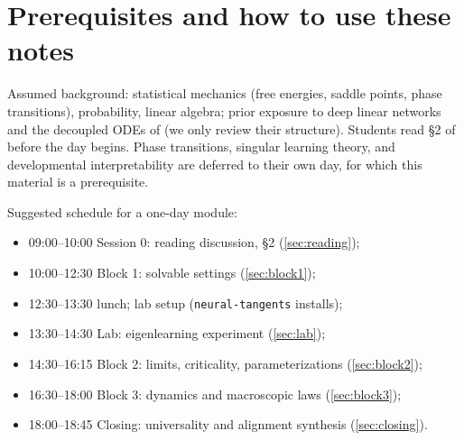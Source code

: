 \documentclass[11pt]{article}
\begin{document}
\section{Prerequisites and how to use these notes}
\label{sec:prereqs}

Assumed background: statistical mechanics (free energies, saddle points,
phase transitions), probability, linear algebra; prior exposure to deep
linear networks and the decoupled ODEs of \cite{saxe2014exact} (we only
review their structure). Students read \S2 of \cite{simon2026scientific}
before the day begins. Phase transitions, singular learning theory, and
developmental interpretability are deferred to their own day, for which this
material is a prerequisite.

Suggested schedule for a one-day module:
\begin{itemize}
  \item 09:00--10:00 \quad Session 0: reading discussion, \cite{simon2026scientific} \S2 (\cref{sec:reading});
  \item 10:00--12:30 \quad Block 1: solvable settings (\cref{sec:block1});
  \item 12:30--13:30 \quad lunch; lab setup (\texttt{neural-tangents} installs);
  \item 13:30--14:30 \quad Lab: eigenlearning experiment (\cref{sec:lab});
  \item 14:30--16:15 \quad Block 2: limits, criticality, parameterizations (\cref{sec:block2});
  \item 16:30--18:00 \quad Block 3: dynamics and macroscopic laws (\cref{sec:block3});
  \item 18:00--18:45 \quad Closing: universality and alignment synthesis (\cref{sec:closing}).
\end{itemize}
\end{document}
